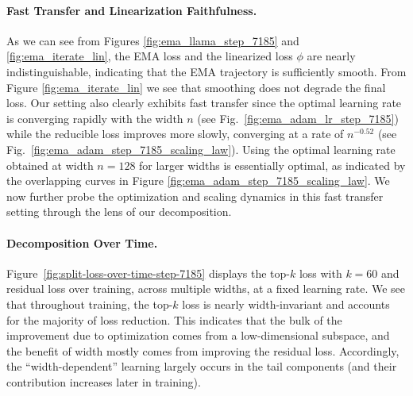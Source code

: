 \documentclass{article} %
\begin{document}
\paragraph{Fast Transfer and Linearization Faithfulness.}  As we can see from Figures \ref{fig:ema_llama_step_7185} and \ref{fig:ema_iterate_lin}, the EMA loss and the linearized loss $\phi$ are nearly indistinguishable, indicating that the EMA trajectory is sufficiently smooth. From Figure \ref{fig:ema_iterate_lin} we see that smoothing does not degrade the final loss. Our setting also clearly exhibits fast transfer since the optimal learning rate is converging rapidly with the width $n$ (see Fig.\ \ref{fig:ema_adam_lr_step_7185}) while the reducible loss improves more slowly, converging at a rate of $n^{-0.52}$ (see Fig.\ \ref{fig:ema_adam_step_7185_scaling_law}). Using the optimal learning rate obtained at width $n = 128$ for larger widths is essentially optimal, as indicated by the overlapping curves in Figure \ref{fig:ema_adam_step_7185_scaling_law}. We now further probe the optimization and scaling dynamics in this fast transfer setting through the lens of our decomposition.



\paragraph{Decomposition Over Time.} Figure~\ref{fig:split-loss-over-time-step-7185} displays the top-$k$ loss with $k = 60$ and residual loss over training, across multiple widths, at a fixed learning rate. We see that throughout training, the top-$k$ loss is nearly width-invariant and accounts for the majority of loss reduction. This indicates that the bulk of the improvement due to optimization comes from a low-dimensional subspace, and the benefit of width mostly comes from improving the residual loss. Accordingly, the ``width-dependent'' learning largely occurs in the tail components (and their contribution increases later in training). 
\end{document}
